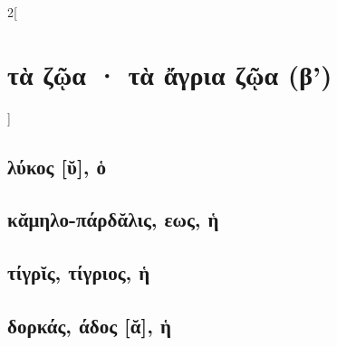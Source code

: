 \documentclass{book}
\begin{document}
\begin{multicols}{2}[\section{τὰ ζῷα · τὰ ἄγρια ζῷα (β')}]
\subsection{λύκος [ῠ], ὁ}
\subsection{κᾰμηλο-πάρδᾰλις, εως, ἡ}
\subsection{τίγρῐς, τίγριος, ἡ}
\subsection{δορκάς, άδος [ᾰ], ἡ}
~
\end{multicols}
\newpage  
\end{document}
